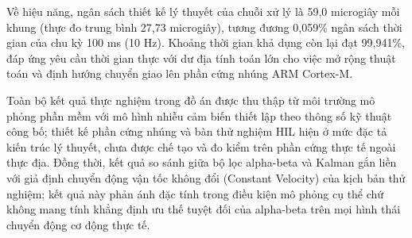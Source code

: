Về hiệu năng, ngân sách thiết kế lý thuyết của chuỗi xử lý là 59,0 microgiây mỗi khung (thực đo trung bình 27,73 microgiây), tương đương 0,059\% ngân sách thời gian của chu kỳ 100 ms (10 Hz). Khoảng thời gian khả dụng còn lại đạt 99,941\%, đáp ứng yêu cầu thời gian thực với dư địa tính toán lớn cho việc mở rộng thuật toán và định hướng chuyển giao lên phần cứng nhúng ARM Cortex-M.

Toàn bộ kết quả thực nghiệm trong đồ án được thu thập từ môi trường mô phỏng phần mềm với mô hình nhiễu cảm biến thiết lập theo thông số kỹ thuật công bố; thiết kế phần cứng nhúng và bàn thử nghiệm HIL hiện ở mức đặc tả kiến trúc lý thuyết, chưa được chế tạo và đo kiểm trên phần cứng thực tế ngoài thực địa. Đồng thời, kết quả so sánh giữa bộ lọc alpha-beta và Kalman gắn liền với giả định chuyển động vận tốc không đổi (Constant Velocity) của kịch bản thử nghiệm; kết quả này phản ánh đặc tính trong điều kiện mô phỏng cụ thể chứ không mang tính khẳng định ưu thế tuyệt đối của alpha-beta trên mọi hình thái chuyển động cơ động thực tế.

\clearpage
